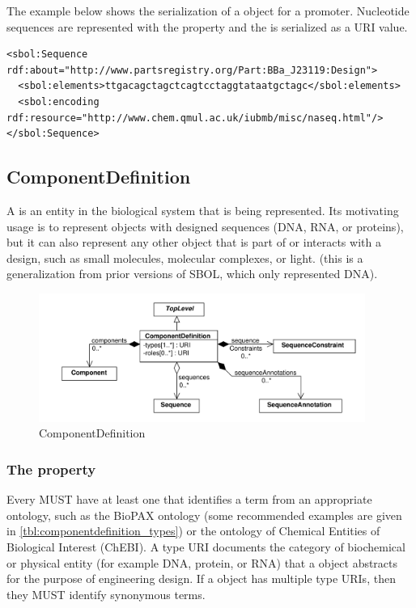 The example below shows the serialization of a  object for a promoter. Nucleotide sequences are represented with the  property and the  is serialized as a URI value. 

\begin{lstlisting}
<sbol:Sequence rdf:about="http://www.partsregistry.org/Part:BBa_J23119:Design">
  <sbol:elements>ttgacagctagctcagtcctaggtataatgctagc</sbol:elements>
  <sbol:encoding rdf:resource="http://www.chem.qmul.ac.uk/iubmb/misc/naseq.html"/>
</sbol:Sequence>
\end{lstlisting}


\subsection{ComponentDefinition}
\label{sec:ComponentDefinition}

A  is an entity in the biological system that is being represented. Its motivating usage is to represent objects with designed sequences (DNA, RNA, or proteins), but it can also represent any other object that is part of or interacts with a design, such as small molecules, molecular complexes, or light.
(this is a generalization from prior versions of SBOL, which only represented DNA).

\begin{figure}[ht]
\begin{center}
\includegraphics[width=0.95\textwidth]{uml/component_definition}
\caption[]{ComponentDefinition}
\label{uml:component_definition}
\end{center}
\end{figure}



\subsubsection*{The  property}
\label{sec:types}
Every  MUST have at least one   that identifies a term from an appropriate ontology, such as the BioPAX ontology (some recommended examples are given in \ref{tbl:componentdefinition_types}) or the ontology of Chemical Entities of Biological Interest (ChEBI). A type URI documents the category of biochemical or physical entity (for example DNA, protein, or RNA) that a  object abstracts for the purpose of engineering design. If a  object has multiple type URIs, then they MUST identify synonymous terms.

